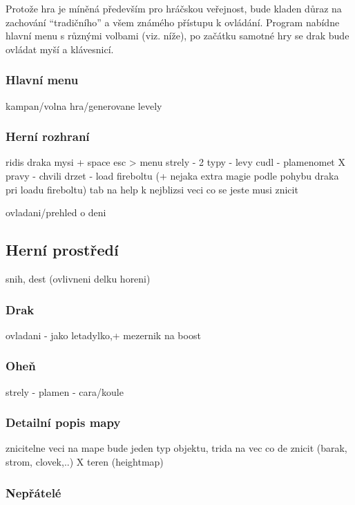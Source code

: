 \documentclass{article}
\begin{document}
Protože hra je míněná především pro hráčskou veřejnost, bude kladen důraz na zachování ``tradičního'' a všem známého přístupu k ovládání. Program nabídne hlavní menu s různými volbami (viz. níže), po začátku samotné hry se drak bude ovládat myší a klávesnicí.

\subsubsection{Hlavní menu}

kampan/volna hra/generovane levely

\subsubsection{Herní rozhraní}

ridis draka mysi + space
esc > menu
strely - 2 typy - levy cudl - plamenomet X pravy - chvili drzet - load fireboltu
(+ nejaka extra magie podle pohybu draka pri loadu fireboltu)
tab na help k nejblizsi veci co se jeste musi znicit

ovladani/prehled o deni

\subsection{Herní prostředí}

snih, dest (ovlivneni delku horeni) 

\subsubsection{Drak}

ovladani - jako letadylko,+ mezernik na boost

\subsubsection{Oheň}

strely - plamen - cara/koule

\subsubsection{Detailní popis mapy}

znicitelne veci na mape bude jeden typ objektu, trida na vec co de znicit (barak, strom, clovek,..) X teren (heightmap)

\subsubsection{Nepřátelé}
\end{document}
